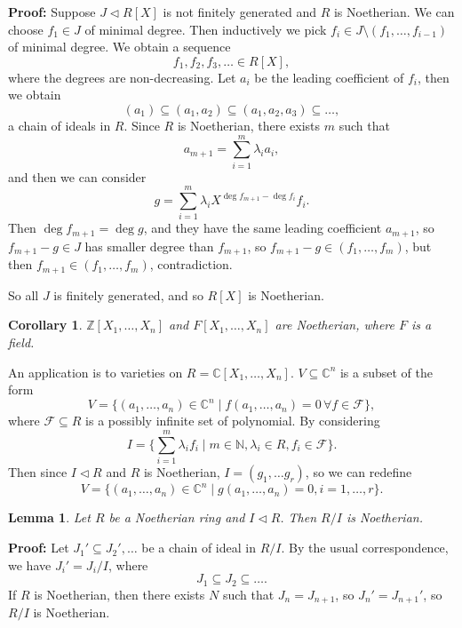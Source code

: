 \documentclass[12pt]{article}
\newtheorem{corollary}{Corollary}[section]
\newtheorem{lemma}{Lemma}[section]
\theoremstyle{definition}
\theoremstyle{remark}
\begin{document}
\begin{adjustbox}{minipage = \columnwidth - 25.5pt, margin=1em, frame=1pt, margin=0em}
	\textbf{Proof:} Suppose $J \lhd R[X]$ is not finitely generated and $R$ is Noetherian. We can choose $f_1 \in J$ of minimal degree. Then inductively we pick $f_i \in J \setminus (f_1, \ldots, f_{i - 1})$ of minimal degree. We obtain a sequence
	\[
		f_1, f_2, f_3, \ldots \in R[X]
	,\]
	where the degrees are non-decreasing. Let $a_i$ be the leading coefficient of $f_i$, then we obtain
	\[
		(a_1) \subseteq (a_1, a_2) \subseteq (a_1, a_2, a_3) \subseteq \ldots
	,\]
	a chain of ideals in $R$. Since $R$ is Noetherian, there exists $m$ such that
	\[
	a_{m + 1} = \sum_{i = 1}^{m} \lambda_i a_i
	,\]
	and then we can consider
	\[
	g = \sum_{i = 1}^{m} \lambda_i X^{\deg f_{m + 1} - \deg f_i} f_i
	.\]
	Then $\deg f_{m + 1} = \deg g$, and they have the same leading coefficient $a_{m + 1}$, so $f_{m + 1} - g \in J$ has smaller degree than $f_{m + 1}$, so $f_{m + 1} - g \in (f_1, \ldots, f_m)$, but then $f_{m + 1} \in (f_1, \ldots, f_m)$, contradiction.

	So all $J$ is finitely generated, and so $R[X]$ is Noetherian.
\end{adjustbox}

\begin{corollary}
	$\mathbb{Z}[X_1, \ldots, X_n]$ and $F[X_1, \ldots, X_n]$ are Noetherian, where $F$ is a field.
\end{corollary}

An application is to varieties on $R = \mathbb{C}[X_1, \ldots, X_n]$. $V \subseteq \mathbb{C}^{n}$ is a subset of the form
\[
	V = \{(a_1, \ldots, a_n) \in \mathbb{C}^{n} \mid f(a_1, \ldots, a_n) = 0 \, \forall f \in \mathcal{F}\}
,\]
where $\mathcal{F} \subseteq R$ is a possibly infinite set of polynomial. By considering
\[
	I = \{ \sum_{i = 1}^{m} \lambda_i f_i \mid m \in \mathbb{N}, \lambda_i \in R, f_i \in \mathcal{F}\}
.\]
Then since $I \lhd R$ and $R$ is Noetherian, $I = (g_1, \ldots g_r)$, so we can redefine
\[
	V = \{(a_1, \ldots, a_n) \in \mathbb{C}^{n} \mid g(a_1, \ldots, a_n) = 0, i = 1, \ldots, r\}
.\]

\begin{lemma}
	Let $R$ be a Noetherian ring and $I \lhd R$. Then $R/I$ is Noetherian.
\end{lemma}

\begin{adjustbox}{minipage = \columnwidth - 25.5pt, margin=1em, frame=1pt, margin=0em}
\textbf{Proof:} Let $J_1' \subseteq J_2', \ldots$ be a chain of ideal in $R/I$. By the usual correspondence, we have $J_i' = J_i/I$, where
\[
J_1 \subseteq J_2 \subseteq \ldots
.\]
If $R$ is Noetherian, then there exists $N$ such that $J_n = J_{n + 1}$, so $J_{n}' = J_{n + 1}'$, so $R/I$ is Noetherian.
\end{adjustbox}
\end{document}
